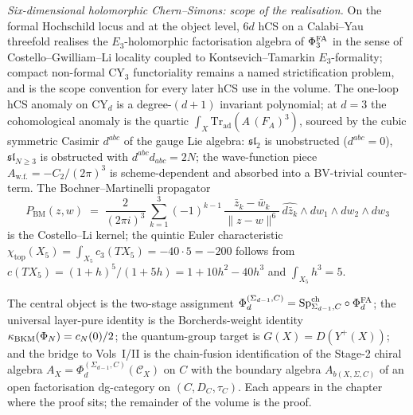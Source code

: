 \textsl{Six-dimensional holomorphic Chern--Simons: scope of the realisation.}\enspace
On the formal Hochschild locus and at the object level, $6d$ hCS on
a Calabi--Yau threefold realises the \(E_3\)-holomorphic factorisation
algebra of $\Phi^{\mathrm{FA}}_3$ in the sense of Costello--Gwilliam--Li
locality coupled to Kontsevich--Tamarkin $E_3$-formality;
compact non-formal CY$_3$ functoriality remains a named
strictification problem, and is the scope convention for every later
hCS use in the volume. The one-loop hCS anomaly on CY$_d$ is a
degree-\((d+1)\) invariant polynomial; at \(d=3\) the cohomological
anomaly is the quartic
\(\int_X\mathrm{Tr}_{\mathrm{ad}}(A\,(F_A)^3)\), sourced by the cubic
symmetric Casimir \(d^{abc}\) of the gauge Lie algebra:
$\mathfrak{sl}_2$ is unobstructed ($d^{abc} = 0$), $\mathfrak{sl}_{N\geq 3}$
is obstructed with $d^{abc}d_{abc} = 2N$; the wave-function piece
$A_{\mathrm{w.f.}} = -C_2/(2\pi)^3$ is scheme-dependent and absorbed
into a BV-trivial counter-term. The Bochner--Martinelli propagator
\[
P_{\mathrm{BM}}(z,w)
\;=\;
\frac{2}{(2\pi i)^3}\,
\sum_{k=1}^{3} (-1)^{k-1}\,
\frac{\bar z_k - \bar w_k}{\|z-w\|^{6}}\,
\widehat{d\bar z_k}\wedge dw_1\wedge dw_2\wedge dw_3
\]
is the Costello--Li kernel; the quintic Euler characteristic
$\chi_{\mathrm{top}}(X_5) = \int_{X_5} c_3(TX_5) = -40 \cdot 5 = -200$
follows from $c(TX_5) = (1+h)^5/(1+5h) = 1 + 10h^2 - 40h^3$ and
$\int_{X_5} h^3 = 5$.

The central object is the two-stage assignment
$\Phi_d^{(\Sigma_{d-1}, C)} = \mathrm{Sp}^{\mathrm{ch}}_{\Sigma_{d-1}, C} \circ \Phi^{\mathrm{FA}}_d$;
the universal layer-pure identity is the Borcherds-weight
identity $\kappa_{\mathrm{BKM}}(\Phi_N) = c_N(0)/2$; the quantum-group target is
$G(X) = D(Y^+(X))$; and the bridge to Vols~I/II is the chain-fusion
identification of the Stage-2 chiral algebra
$A_X = \Phi_d^{(\Sigma_{d-1}, C)}(\mathcal C_X)$ on $C$ with the
boundary algebra $A_{b(X, \Sigma, C)}$ of an open factorisation
dg-category on $(C, D_C, \tau_C)$. Each appears in the chapter where
the proof sits; the remainder of the volume is the proof.
